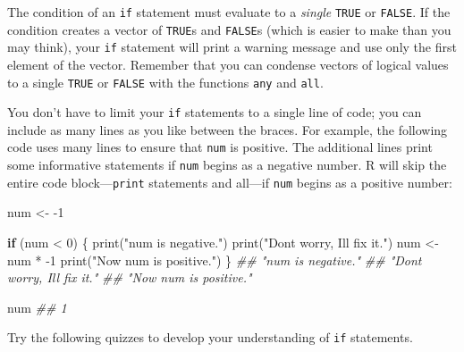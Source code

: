 \documentclass[
  letterpaper,
  DIV=11,
  numbers=noendperiod]{scrbook}
\newenvironment{Shaded}{\begin{snugshade}}{\end{snugshade}}
\newcommand{\ControlFlowTok}[1]{\textcolor[rgb]{0.00,0.23,0.31}{\textbf{#1}}}
\newcommand{\DecValTok}[1]{\textcolor[rgb]{0.68,0.00,0.00}{#1}}
\newcommand{\DocumentationTok}[1]{\textcolor[rgb]{0.37,0.37,0.37}{\textit{#1}}}
\newcommand{\FunctionTok}[1]{\textcolor[rgb]{0.28,0.35,0.67}{#1}}
\newcommand{\NormalTok}[1]{\textcolor[rgb]{0.00,0.23,0.31}{#1}}
\newcommand{\OtherTok}[1]{\textcolor[rgb]{0.00,0.23,0.31}{#1}}
\newcommand{\SpecialCharTok}[1]{\textcolor[rgb]{0.37,0.37,0.37}{#1}}
\newcommand{\StringTok}[1]{\textcolor[rgb]{0.13,0.47,0.30}{#1}}
\begin{document}
The condition of an \texttt{if} statement must evaluate to a
\emph{single} \texttt{TRUE} or \texttt{FALSE}. If the condition creates
a vector of \texttt{TRUE}s and \texttt{FALSE}s (which is easier to make
than you may think), your \texttt{if} statement will print a warning
message and use only the first element of the vector. Remember that you
can condense vectors of logical values to a single \texttt{TRUE} or
\texttt{FALSE} with the functions \texttt{any} and \texttt{all}.

You don't have to limit your \texttt{if} statements to a single line of
code; you can include as many lines as you like between the braces. For
example, the following code uses many lines to ensure that \texttt{num}
is positive. The additional lines print some informative statements if
\texttt{num} begins as a negative number. R will skip the entire code
block---\texttt{print} statements and all---if \texttt{num} begins as a
positive number:

\begin{Shaded}
\begin{Highlighting}[]
\NormalTok{num }\OtherTok{\textless{}{-}} \SpecialCharTok{{-}}\DecValTok{1}

\ControlFlowTok{if}\NormalTok{ (num }\SpecialCharTok{\textless{}} \DecValTok{0}\NormalTok{) \{}
  \FunctionTok{print}\NormalTok{(}\StringTok{"num is negative."}\NormalTok{)}
  \FunctionTok{print}\NormalTok{(}\StringTok{"Don\textquotesingle{}t worry, I\textquotesingle{}ll fix it."}\NormalTok{)}
\NormalTok{  num }\OtherTok{\textless{}{-}}\NormalTok{ num }\SpecialCharTok{*} \SpecialCharTok{{-}}\DecValTok{1}
  \FunctionTok{print}\NormalTok{(}\StringTok{"Now num is positive."}\NormalTok{)}
\NormalTok{\}}
\DocumentationTok{\#\# "num is negative."}
\DocumentationTok{\#\# "Don\textquotesingle{}t worry, I\textquotesingle{}ll fix it."}
\DocumentationTok{\#\# "Now num is positive."}

\NormalTok{num}
\DocumentationTok{\#\# 1}
\end{Highlighting}
\end{Shaded}

Try the following quizzes to develop your understanding of \texttt{if}
statements.
\end{document}
